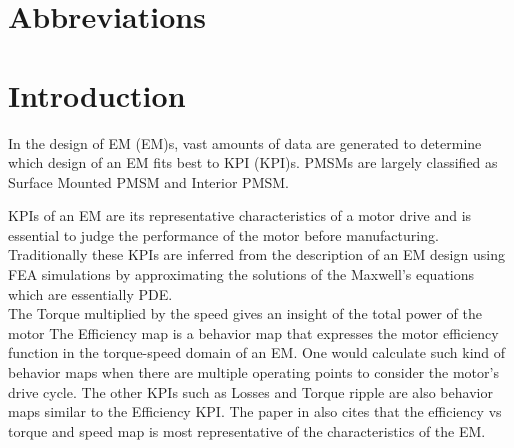 \documentclass{report} %
\begin{document}
\newpage

\newpage

\begin{spacing}{1.2}
    \tableofcontents
\end{spacing}

\newpage

\newpage

\chapter*{Abbreviations}
\begin{acronym}[TDMA]
  

\end{acronym}

\newpage

\newpage

\chapter{Introduction} 
In the design of \acl{EM} (\ac{EM})s, vast amounts of data are generated to determine which design of an \ac{EM} fits best to \acl{KPI} (\ac{KPI})s.
\ac{PMSM}s are largely classified as Surface Mounted \ac{PMSM} and Interior \ac{PMSM}.

\ac{KPI}s of an \ac{EM} are its representative characteristics of a motor drive and is essential to judge the performance of the motor before manufacturing.
Traditionally these \ac{KPI}s are inferred from the description of an \ac{EM} design using \ac{FEA} simulations by approximating the solutions of the Maxwell's equations which are essentially \ac{PDE}. \\
The Torque multiplied by the speed gives an insight of the total power of the motor
The Efficiency map is a behavior map that expresses the motor efficiency function in the torque-speed domain of an \ac{EM}.
One would calculate such kind of behavior maps when there are multiple operating points to consider the motor's drive cycle.
The other \ac{KPI}s such as Losses and Torque ripple are also behavior maps similar to the Efficiency \ac{KPI}.
The paper in \cite{ETA-2021} also cites that the efficiency vs torque and speed map is most representative of the characteristics of the \ac{EM}. 
\end{document}
